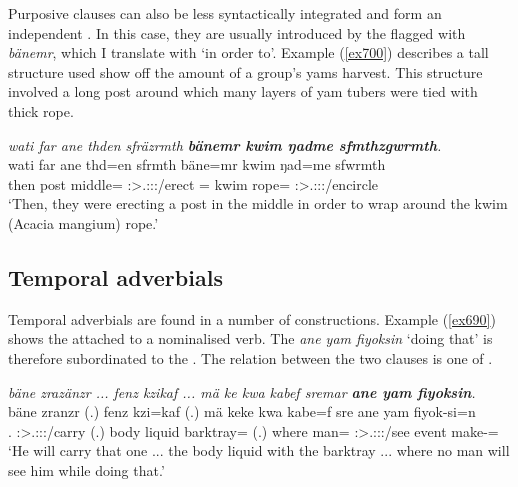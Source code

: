 Purposive clauses can also be less syntactically integrated and form an independent . In this case, they are usually introduced by the  flagged with   \emph{bänemr}, which I translate with `in order to'. Example (\ref{ex700}) describes a tall structure used show off the amount of a group's yams harvest. This structure involved a long post around which many layers of yam tubers were tied with thick rope.

\begin{exe}
	\ex \emph{wati far ane thden sfräzrmth \textbf{bänemr kwim ŋadme sfmthzgwrmth}.}\\
	\gll wati far ane thd=en sfrmth bäne=mr kwim ŋad=me sfwrmth\\
	then post \Dem{} middle=\Loc{} \Stpl:\Sbj>\Tsg.\Masc:\Obj:\Pst:\Dur/erect \Recog=\Purp{} kwim rope=\Ins{} \Stpl:\Sbj>\Tsg.\Masc:\Obj:\Pst:\Dur/encircle\\
	\trans `Then, they were erecting a post in the middle in order to wrap around the kwim (Acacia mangium) rope.'
	\label{ex700}
\end{exe}

\subsection{Temporal adverbials}\label{tempadverbials}

Temporal adverbials are found in a number of constructions. Example (\ref{ex690}) shows the   attached to a nominalised verb. The  \emph{ane yam fiyoksin} `doing that' is therefore subordinated to the . The relation between the two clauses is one of .

\begin{exe}
	\ex \emph{bäne zrazänzr ... fenz kzikaf ... mä ke kwa kabef sremar \textbf{ane yam fiyoksin}.}\\
	\gll bäne zranzr (.) fenz kzi=kaf (.) mä keke kwa kabe=f sre ane yam fiyok-si=n\\
	\Recog.\Abs{} \Stsg:\Sbj>\Tsg.\F:\Obj:\Irr:\Ipfv/carry (.) {body liquid} barktray=\Prop{} (.) where \Neg{} \Fut{} man=\Erg{} \Stsg:\Sbj>\Tsg.\Masc:\Obj:\Irr:\Pfv/see \Dem{} event make-\Nmlz=\Loc{}\\
	\trans `He will carry that one ... the body liquid with the barktray ... where no man will see him while doing that.'
	\label{ex690}
\end{exe}

